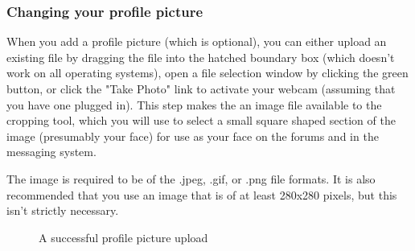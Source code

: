 \documentclass[10pt]{article}
\begin{document}
\subsubsection{Changing your profile picture}

\begin{flushleft}
When you add a profile picture (which is optional), you can either upload an existing file by dragging the file into the hatched boundary box (which doesn't work on all operating systems), open a file selection window by clicking the green button, or click the "Take Photo" link to activate your webcam (assuming that you have one plugged in).  This step makes the an image file available to the cropping tool, which you will use to select a small square shaped section of the image (presumably your face) for use as your face on the forums and in the messaging system. 

\end{flushleft}
 The image is required to be of the .jpeg, .gif, or .png file formats.  It is also recommended that you use an image that is of at least 280x280 pixels, but this isn't strictly necessary. 
\begin{flushleft}

\end{flushleft}

\begin{figure}[h]
    \centering
    \qquad
    \caption{A successful profile picture upload}
    \label{avatarUp}
\end{figure}
\end{document}
